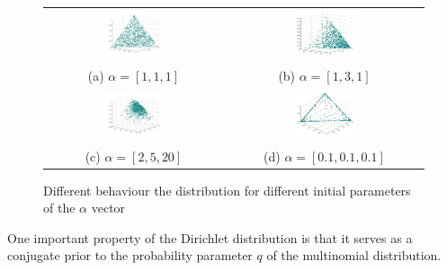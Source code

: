 \documentclass[twoside,hidelinks]{article}
\begin{document}
    \begin{figure}[!h]
        \begin{tabular}{cc}
       	          \includegraphics[width=0.35\textwidth]{uniformDist} & \includegraphics[width=0.35\textwidth]{1-3-1Ddist} \\
    		(a) $ \alpha = [1,1,1] $ & (b) $ \alpha = [1,3,1] $  \\[6pt]
    		 \includegraphics[width=0.35\textwidth]{2-5-20Dist} &    \includegraphics[width=0.35\textwidth]{01-01-01Dist} \\
    		(c) $ \alpha = [2,5,20] $  & (d) $ \alpha = [0.1,0.1,0.1] $  \\[6pt]
    	\end{tabular}
    	\caption{Different behaviour the distribution for different initial parameters of the $\alpha$ vector}
    	\label{firstplot}
     \end{figure}

One important property of the Dirichlet distribution is that it serves as a conjugate prior to the probability parameter $q$ of the multinomial distribution. 
\end{document}
